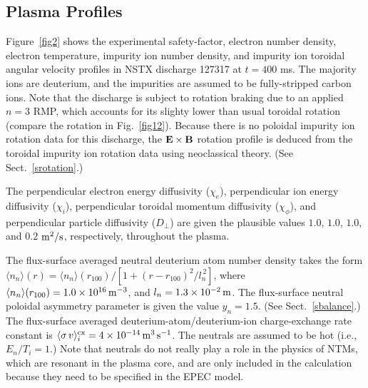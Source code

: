\documentclass[12pt,prb,aps]{revtex4-1}
\begin{document}
\subsection{Plasma Profiles}
Figure~\ref{fig2} shows the experimental safety-factor, electron number density, electron temperature, impurity ion number density, and impurity ion toroidal angular velocity profiles in NSTX discharge 127317 at $t=400$ ms. The majority ions are deuterium, and the impurities are assumed to
be fully-stripped carbon ions. Note that the discharge is subject to rotation braking due to an applied $n=3$ RMP, which accounts for its slighty lower than usual toroidal rotation (compare the rotation in Fig.~\ref{fig12}). Because there is no
poloidal impurity ion rotation data for this discharge, the ${\bf E}\times {\bf B}$ rotation profile is deduced from the
toroidal  impurity ion rotation data using neoclassical theory. (See Sect.~\ref{srotation}.) 

The perpendicular electron energy diffusivity ($\chi_e$), perpendicular ion energy diffusivity ($\chi_i$), perpendicular toroidal momentum diffusivity ($\chi_\phi$), and perpendicular particle diffusivity ($D_\perp$) are given the plausible values $1.0$, $1.0$, $1.0$, and $0.2$
${\rm m}^2/{\rm s}$, respectively,  throughout the plasma.

 The flux-surface averaged neutral deuterium atom number density takes the form $\langle n_n\rangle(r) = \langle n_n\rangle(r_{100})/[1+(r-r_{100})^2/l_n^{\,2}]$, where
$\langle n_n\rangle(r_{100})= 1.0\times 10^{16}\,{\rm m}^{-3}$, and $l_n=1.3\times 10^{-2}\,{\rm m}$. The flux-surface neutral poloidal asymmetry parameter is given the value $y_n=1.5$. (See Sect.~\ref{sbalance}.) The flux-surface averaged deuterium-atom/deuterium-ion charge-exchange rate constant is $\langle \sigma\,v\rangle_i^{{\rm cx}} = 4\times 10^{-14}\,{\rm m}^{3}\,{\rm s}^{-1}$.\cite{barnett} The neutrals are assumed to be hot (i.e., $E_n/T_i=1$.) 
Note that neutrals do not really play a role in the physics of NTMs, which are resonant in the plasma core, and are
only included in the calculation because they need to be specified in the EPEC model. 
\end{document}
